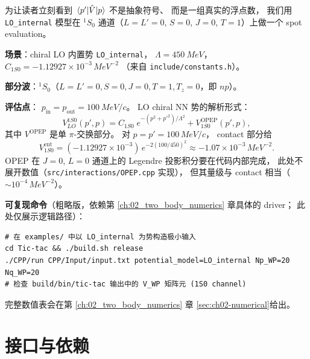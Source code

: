 为让读者立刻看到 $\matrixel{p'}{\Vop}{p}$ 不是抽象符号、
而是一组真实的浮点数，
我们用 \texttt{LO\_internal} 模型在 $^{1}S_0$ 通道（$L = L' = 0$, $S = 0$, $J = 0$, $T = 1$）上做一个 spot evaluation。

\begin{numericalbox}
\textbf{场景}：chiral LO 内置势 \texttt{LO\_internal}，
$\Lambda = \SI{450}{MeV}$，$C_{1S0} = -1.12927 \times 10^{-3}\,\si{MeV^{-2}}$
（来自 \texttt{include/constants.h}）。

\textbf{部分波}：$^{1}S_0$（$L = L' = 0, S = 0, J = 0, T = 1, T_z = 0$，即 $np$）。

\textbf{评估点}：
$p_{\text{in}} = p_{\text{out}} = \SI{100}{MeV/c}$。
LO chiral NN 势的解析形式：
\begin{equation}
  V_{LO}^{1S0}(p', p)
  = C_{1S0}\; e^{-(p^2 + p'^2)/\Lambda^2}
  + V^{\text{OPEP}}_{1S0}(p', p),
  \label{eq:ch01-LO-form}
\end{equation}
其中 $V^{\text{OPEP}}$ 是单 $\pi$-交换部分。
对 $p = p' = 100\,\si{MeV/c}$，
contact 部分给
\begin{equation*}
  V^{\text{cnt}}_{1S0} = (-1.12927\times 10^{-3})\,e^{-2(100/450)^2}
  \approx -1.07 \times 10^{-3}\,\si{MeV^{-2}}.
\end{equation*}
OPEP 在 $J = 0$, $L = 0$ 通道上的 Legendre 投影积分要在代码内部完成，
此处不展开数值（\texttt{src/interactions/OPEP.cpp} 实现），
但其量级与 contact 相当（$\sim 10^{-4}\,\si{MeV^{-2}}$）。

\textbf{可复现命令}（粗略版，依赖第 \ref{ch:02_two_body_numerics} 章具体的 driver；
此处仅展示逻辑路径）：
\begin{lstlisting}[style=config,basicstyle=\ttfamily\small]
# 在 examples/ 中以 LO_internal 为势构造极小输入
cd Tic-tac && ./build.sh release
./CPP/run CPP/Input/input.txt potential_model=LO_internal Np_WP=20 Nq_WP=20
# 检查 build/bin/tic-tac 输出中的 V_WP 矩阵元 (1S0 channel)
\end{lstlisting}
完整数值表会在第 \ref{ch:02_two_body_numerics} 章 \cref{sec:ch02-numerical}给出。
\end{numericalbox}

\section{接口与依赖}
\label{sec:ch01-interface}

